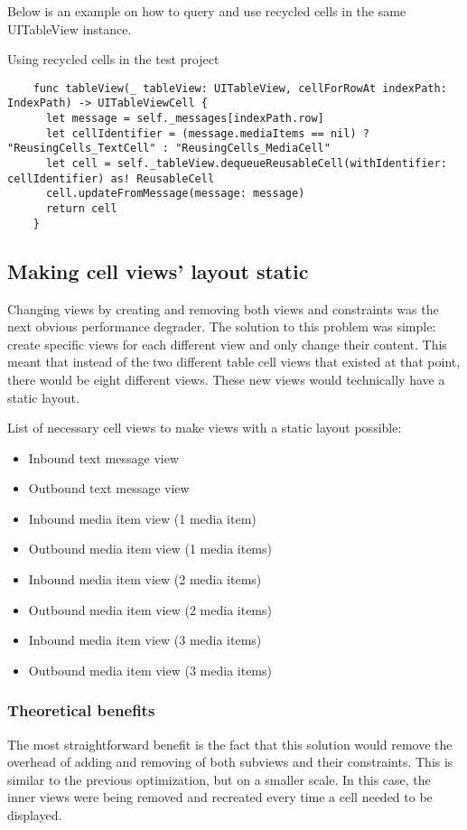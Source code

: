 \documentclass[a4paper,12pt]{article}
\begin{document}
Below is an example on how to query and use recycled cells in the same UITableView instance.
\begin{listing}[H]
  \caption{Using recycled cells in the test project}
  \begin{verbatim}
    func tableView(_ tableView: UITableView, cellForRowAt indexPath: IndexPath) -> UITableViewCell {
      let message = self._messages[indexPath.row]
      let cellIdentifier = (message.mediaItems == nil) ? "ReusingCells_TextCell" : "ReusingCells_MediaCell"
      let cell = self._tableView.dequeueReusableCell(withIdentifier: cellIdentifier) as! ReusableCell
      cell.updateFromMessage(message: message)
      return cell
    }
  \end{verbatim}
\end{listing}

\subsection{Making cell views' layout static}
Changing views by creating and removing both views and constraints was the next obvious performance degrader. The solution to this problem was simple: create specific views for each different view and only change their content. This meant that instead of the two different table cell views that existed at that point, there would be eight different views. These new views would technically have a static layout.

List of necessary cell views to make views with a static layout possible:
\begin{itemize}
  \item Inbound text message view
  \item Outbound text message view
  \item Inbound media item view (1 media item)
  \item Outbound media item view (1 media items)
  \item Inbound media item view (2 media items)
  \item Outbound media item view (2 media items)
  \item Inbound media item view (3 media items)
  \item Outbound media item view (3 media items)
\end{itemize}

\subsubsection*{Theoretical benefits}
The most straightforward benefit is the fact that this solution would remove the overhead of adding and removing of both subviews and their constraints. This is similar to the previous optimization, but on a smaller scale. In this case, the inner views were being removed and recreated every time a cell needed to be displayed. 
\end{document}
